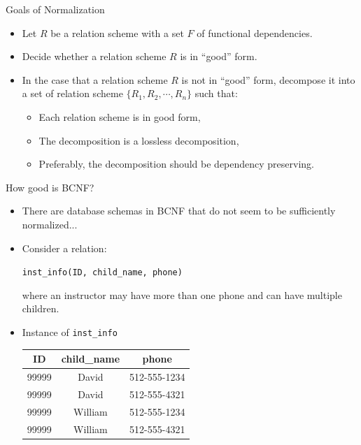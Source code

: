\documentclass{beamer}
\begin{document}
\begin{frame}{Goals of Normalization}
    \begin{itemize}
        \item Let $R$ be a relation scheme with a set $F$ of functional dependencies.
        \item Decide whether a relation scheme $R$ is in ``good'' form.
        \item In the case that a relation scheme $R$ is not in ``good'' form, decompose it into a set of relation scheme $\{R_1, R_2, \cdots, R_n\}$ such that:
            \begin{itemize}
                \item Each relation scheme is in good form,
                \item The decomposition is a lossless decomposition,
                \item Preferably, the decomposition should be dependency preserving.
            \end{itemize}
    \end{itemize}
\end{frame}

\begin{frame}{How good is BCNF?}
    \begin{itemize}
        \item There are database schemas in BCNF that do not seem to be sufficiently normalized...
        \item Consider a relation:
            \begin{center}
                \texttt{inst\_info(ID, child\_name, phone)}
            \end{center}
        where an instructor may have more than one phone and can have multiple children.
        \item Instance of \texttt{inst\_info}
            \begin{center}
                \begin{tabular}{ c c c}
                    \hline
                    \textbf{ID} & \textbf{child\_name} & \textbf{phone} \\
                    \hline
                    99999 & David   & 512-555-1234 \\
                    99999 & David   & 512-555-4321 \\
                    99999 & William & 512-555-1234 \\
                    99999 & William & 512-555-4321 \\
                    \hline
                \end{tabular}
            \end{center}
    \end{itemize}
\end{frame}
\end{document}
